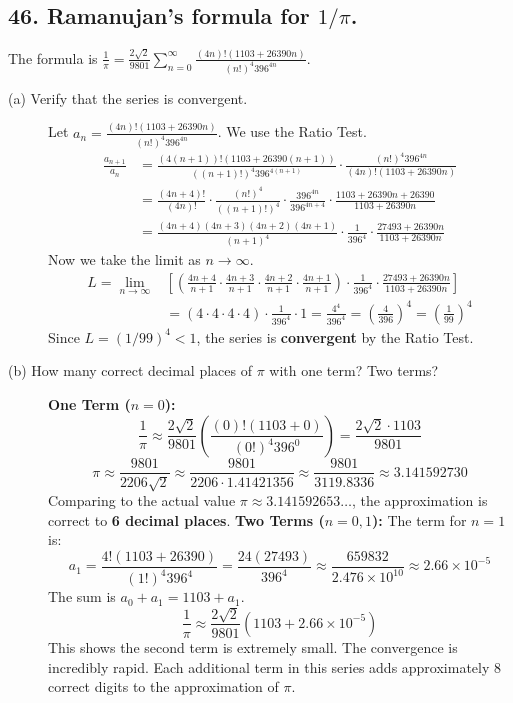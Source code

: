 \documentclass{article}
\begin{document}
\subsection*{46. Ramanujan's formula for $1/\pi$.}
The formula is $\frac{1}{\pi} = \frac{2\sqrt{2}}{9801} \sum_{n=0}^{\infty} \frac{(4n)!(1103+26390n)}{(n!)^4 396^{4n}}$.
\begin{description}
    \item[(a) Verify that the series is convergent.]
    Let $a_n = \frac{(4n)!(1103+26390n)}{(n!)^4 396^{4n}}$. We use the Ratio Test.
    \begin{align*}
        \frac{a_{n+1}}{a_n} &= \frac{(4(n+1))!(1103+26390(n+1))}{((n+1)!)^4 396^{4(n+1)}} \cdot \frac{(n!)^4 396^{4n}}{(4n)!(1103+26390n)} \\
        &= \frac{(4n+4)!}{(4n)!} \cdot \frac{(n!)^4}{((n+1)!)^4} \cdot \frac{396^{4n}}{396^{4n+4}} \cdot \frac{1103+26390n+26390}{1103+26390n} \\
        &= \frac{(4n+4)(4n+3)(4n+2)(4n+1)}{(n+1)^4} \cdot \frac{1}{396^4} \cdot \frac{27493+26390n}{1103+26390n}
    \end{align*}
    Now we take the limit as $n \to \infty$.
    \begin{align*}
        L = \lim_{n \to \infty} &\left[ \left(\frac{4n+4}{n+1} \cdot \frac{4n+3}{n+1} \cdot \frac{4n+2}{n+1} \cdot \frac{4n+1}{n+1}\right) \cdot \frac{1}{396^4} \cdot \frac{27493+26390n}{1103+26390n} \right] \\
        &= \left(4 \cdot 4 \cdot 4 \cdot 4\right) \cdot \frac{1}{396^4} \cdot 1 = \frac{4^4}{396^4} = \left(\frac{4}{396}\right)^4 = \left(\frac{1}{99}\right)^4
    \end{align*}
    Since $L = (1/99)^4 < 1$, the series is \textbf{convergent} by the Ratio Test.
    \item[(b) How many correct decimal places of $\pi$ with one term? Two terms?]
    \textbf{One Term ($n=0$):}
    \[ \frac{1}{\pi} \approx \frac{2\sqrt{2}}{9801} \left( \frac{(0)!(1103+0)}{(0!)^4 396^0} \right) = \frac{2\sqrt{2} \cdot 1103}{9801} \]
    \[ \pi \approx \frac{9801}{2206\sqrt{2}} \approx \frac{9801}{2206 \cdot 1.41421356} \approx \frac{9801}{3119.8336} \approx 3.141592730 \]
    Comparing to the actual value $\pi \approx 3.141592653\dots$, the approximation is correct to \textbf{6 decimal places}.
    \textbf{Two Terms ($n=0, 1$):}
    The term for $n=1$ is:
    \[ a_1 = \frac{4!(1103+26390)}{(1!)^4 396^4} = \frac{24(27493)}{396^4} \approx \frac{659832}{2.476 \times 10^{10}} \approx 2.66 \times 10^{-5} \]
    The sum is $a_0+a_1 = 1103 + a_1$.
    \[ \frac{1}{\pi} \approx \frac{2\sqrt{2}}{9801}(1103 + 2.66 \times 10^{-5}) \]
    This shows the second term is extremely small. The convergence is incredibly rapid. Each additional term in this series adds approximately 8 correct digits to the approximation of $\pi$.
\end{description}
\end{document}
